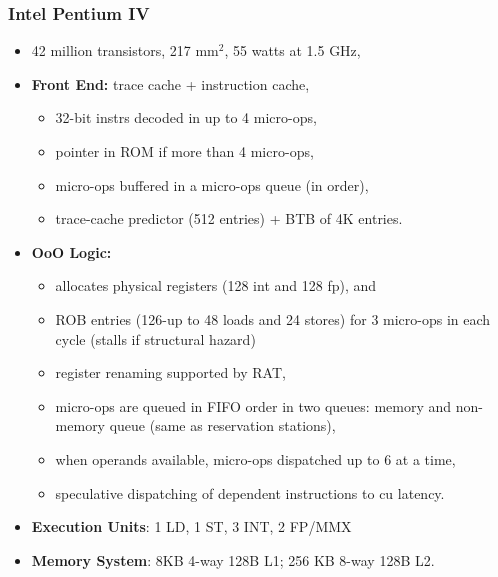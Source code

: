\documentclass{beamer}
\newcommand{\emp}[1]{\textcolor{DikuRed}{ #1}}
\begin{document}
\begin{frame}[fragile,t]
\frametitle{Intel Pentium IV}

\begin{itemize}
\item 42 million transistors, 217 mm$^2$, 55 watts at 1.5 GHz,\medskip
\item \emp{\bf Front End:} trace cache + instruction cache,
    \begin{itemize}
        \item 32-bit instrs decoded in up to 4 micro-ops,
        \item pointer in ROM if more than 4 micro-ops,
        \item micro-ops buffered in a micro-ops queue (in order),
        \item trace-cache predictor (512 entries) + BTB of 4K entries.
    \end{itemize}\medskip
\item \emp{\bf OoO Logic:}
    \begin{itemize}
        \item allocates physical registers (128 int and 128 fp), and 
        \item ROB entries (126-up to 48 loads and 24 stores) for 3 micro-ops in each cycle
                (stalls if structural hazard)
        \item register renaming supported by RAT,
        \item micro-ops are queued in FIFO order in two queues: memory and non-memory queue (same as reservation stations),
        \item when operands available, micro-ops dispatched up to 6 at a time,
        \item speculative dispatching of dependent instructions to cu latency.
    \end{itemize}\medskip
\item \emp{\bf Execution Units}: 1 LD, 1 ST, 3 INT, 2 FP/MMX\medskip
\item \emp{\bf Memory System}: 8KB 4-way 128B L1; 256 KB 8-way 128B L2.
\end{itemize}


\end{frame}
\end{document}
